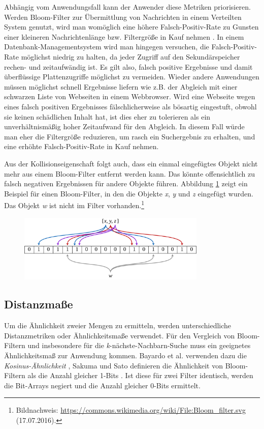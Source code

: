 Abhängig vom Anwendungsfall kann der Anwender diese Metriken priorisieren. Werden Bloom-Filter zur Übermittlung von Nachrichten in einem Verteilten System genutzt, wird man womöglich eine höhere Falsch-Positiv-Rate zu Gunsten einer kleineren Nachrichtenlänge bzw. Filtergröße in Kauf nehmen \cite{Mitzenmacher2002}. In einem Datenbank-Managementsystem wird man hingegen versuchen, die Falsch-Positiv-Rate möglichst niedrig zu halten, da jeder Zugriff auf den Sekundärspeicher rechen- und zeitaufwändig ist. Es gilt also, falsch positive Ergebnisse und damit überflüssige Plattenzugriffe möglichst zu vermeiden. Wieder andere Anwendungen müssen möglichst schnell Ergebnisse liefern wie z.B. der Abgleich mit einer schwarzen Liste von Webseiten in einem Webbrowser. Wird eine Webseite wegen eines falsch positiven Ergebnisses fälschlicherweise als bösartig eingestuft, obwohl sie keinen schädlichen Inhalt hat, ist dies eher zu tolerieren als ein unverhältnismäßig hoher Zeitaufwand für den Abgleich. In diesem Fall würde man eher die Filtergröße reduzieren, um rasch ein Suchergebnis zu erhalten, und eine erhöhte Falsch-Positiv-Rate in Kauf nehmen. 

Aus der Kollisionseigenschaft folgt auch, dass ein einmal eingefügtes Objekt nicht mehr aus einem Bloom-Filter entfernt werden kann. Das könnte offensichtlich zu falsch negativen Ergebnissen für andere Objekte führen. Abbildung \ref{fig:pic0} zeigt ein Beispiel für einen Bloom-Filter, in den die Objekte \textit{x}, \textit{y} und \textit{z} eingefügt wurden. Das Objekt \textit{w} ist nicht im Filter vorhanden.\footnote{Bildnachweis: \url{https://commons.wikimedia.org/wiki/File:Bloom_filter.svg} (17.07.2016).}
\begin{figure}[hpbt]
  \centering
  \label{fig:pic0}
  \includegraphics[width=0.8\textwidth]{pictures/1280px-Bloom_filter.png}
\end{figure}
\subsection{Distanzmaße}\label{sec:distanzmasse}
Um die Ähnlichkeit zweier Mengen zu ermitteln, werden unterschiedliche Distanzmetriken oder Ähnlichkeitsmaße verwendet. Für den Vergleich von Bloom-Filtern und insbesondere für die \textit{k}-nächste-Nachbarn-Suche muss ein geeignetes Ähnlichkeitsmaß zur Anwendung kommen. Bayardo et al. verwenden dazu die \textit{Kosinus-Ähnlichkeit} \cite{Bayardo2007}, Sakuma und Sato definieren die Ähnlichkeit von Bloom-Filtern als die Anzahl gleicher 1-Bits \cite{Sakuma2011}. Ist diese für zwei Filter identisch, werden die Bit-Arrays negiert und die Anzahl gleicher 0-Bits ermittelt. 

